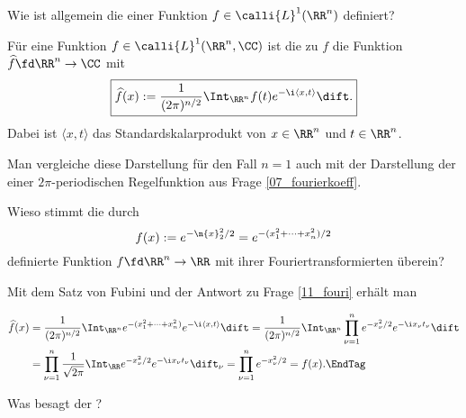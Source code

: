 \begin{frage}
  Wie ist allgemein die  einer Funktion 
  $f\in\calli{L}^1(\RR^n)$ definiert?
\end{frage}

\begin{antwort}
  Für eine Funktion $f \in\calli{L}^1(\RR^n,\CC)$ ist die 
   zu $f$ die Funktion 
  $\widehat{f} \fd \RR^n \to\CC$ mit 
  \[
  \boxed{ 
    \widehat{f}(x) := \frac{1}{(2\pi)^{n/2}} \Int_{\RR^n} 
    f(t)e^{-\i \langle x,t\rangle} \dift.
  }
  \]
  Dabei ist $\langle x,t \rangle$ das Standardskalarprodukt 
  von $x\in\RR^n$ und $t\in\RR^n$. 

  Man vergleiche diese Darstellung für den Fall $n=1$ auch mit der 
  Darstellung der  einer 
  $2\pi$-periodischen Regelfunktion aus Frage \ref{07_fourierkoeff}.   
  \AntEnd
\end{antwort}

\begin{frage}
  Wieso stimmt die durch 
  \[
  f(x):=e^{-\n{x}_2^2/2} = e^{-(x_1^2+\cdots + x_n^2)/2}
  \]
  definierte Funktion $f\fd \RR^n\to\RR$ mit ihrer Fouriertransformierten 
  überein?
\end{frage}

\begin{antwort}
  Mit dem Satz von Fubini und der Antwort zu Frage \ref{11_fouri} 
  erhält man

  \begin{align*}
    \widehat{f}(x) &= \frac{1}{(2\pi)^{n/2}} 
    \Int_{\RR^n} e^{-(x_1^2+\cdots +x_n^2)} e^{-\i \langle x,t \rangle} \dift  
    = \frac{1}{(2\pi)^{n/2}} \Int_{\RR^n} \prod_{\nu=1}^n e^{-x_\nu^2/2} 
    e^{-\i x_\nu t_\nu} \dift \\
    &= 
    \prod_{\nu=1}^n \frac{1}{\sqrt{2\pi}} \Int_\RR 
    e^{-x_\nu^2/2} e^{-\i x_\nu t_\nu} \dift_\nu = 
    \prod_{\nu=1}^n e^{-x_\nu^2/2} = f(x).
    \EndTag
  \end{align*}
\end{antwort}



\begin{frage}
  Was besagt der ?
\end{frage}


